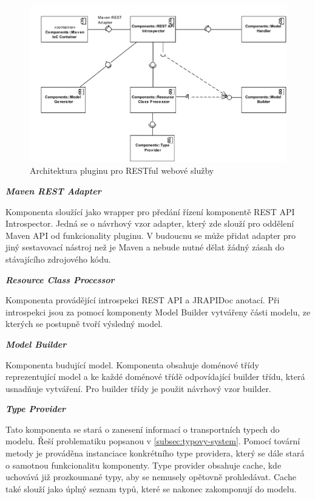 \documentclass[11pt,twoside,a4paper]{book}
\begin{document}
\begin{figure}[h]
\begin{center}
\includegraphics[width=13cm]{images-pdf/RESTModelGenerator.pdf}
\caption{Architektura pluginu pro RESTful webové služby}
\label{fig:rest-plugin-architektura}
\end{center}
\end{figure}

\textbf{\textit{Maven REST Adapter}}

Komponenta sloužící jako wrapper pro předání řízení komponentě REST API Introspector.
Jedná se o návrhový vzor adapter, který zde slouží pro oddělení Maven API od funkcionality
pluginu. V budoucnu se může přidat adapter pro jiný sestavovací nástroj než je
Maven a nebude nutné dělat žádný zásah do stávajícího zdrojového kódu.

\textbf{\textit{Resource Class Processor}}

Komponenta provádějící introspekci REST API a JRAPIDoc anotací. Při introspekci jsou za
pomocí komponenty Model Builder vytvářeny části modelu, ze kterých se postupně tvoří
výsledný model.

\textbf{\textit{Model Builder}}

Komponenta budující model. Komponenta obsahuje doménové třídy reprezentující model a
ke každé doménové třídě odpovídající builder třídu, která usnadňuje vytváření. Pro builder
třídy je použit návrhový vzor builder.

\textbf{\textit{Type Provider}}

Tato komponenta se stará o zanesení informací o transportních typech do modelu. Řeší
problematiku popsanou v \ref{subsec:typovy-system}. Pomocí tovární metody je prováděna
instanciace konkrétního type providera, který se dále stará o samotnou funkcionalitu komponenty. Type
provider obsahuje cache, kde uchovává již prozkoumané typy, aby se nemusely opětovně
prohledávat. Cache také slouží jako úplný seznam typů, které se nakonec zakomponují do
modelu.
\end{document}

